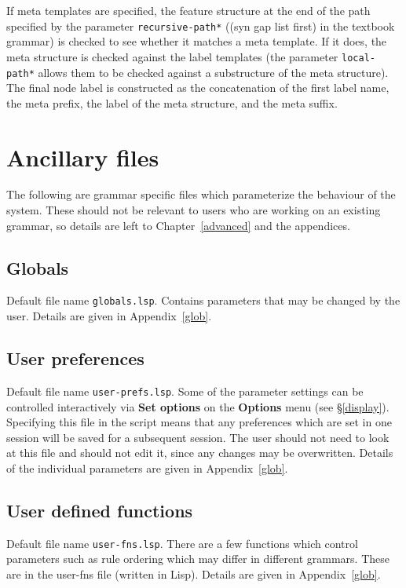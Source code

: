 \documentclass[12pt]{report}
\newcommand{\filename}[1]{{\tt #1}}
\newcommand{\lkbparam}[1]{{\tt #1}}
\newcommand{\lkbmenucommand}{\bf}
\begin{document}
If meta templates are specified, the feature structure at the
end of the path specified by the parameter \lkbparam{*recursive-path*}
(({\feature syn gap list first}) in the textbook grammar)
is checked to see whether it matches a meta template.
If it does, the meta structure is checked against the label templates 
(the parameter \lkbparam{*local-path*}
allows them to be checked against a substructure of the meta structure).
The final node label is constructed as the concatenation
of the first label name, the meta prefix, the label of
the meta structure, and the meta suffix.  


\section{Ancillary files}
\label{ancil}

The following are grammar specific files which parameterize the behaviour of
the system.  These should not be relevant to users who are working on an
existing grammar, so details are left to Chapter~\ref{advanced} and the
appendices.

\subsection{Globals}

Default file name \filename{globals.lsp}.
Contains parameters that may be changed by the user.  
Details are given in Appendix~\ref{glob}.

\subsection{User preferences}

Default file name \filename{user-prefs.lsp}.
Some of the parameter settings can be controlled interactively
via {\lkbmenucommand Set options} on the {\lkbmenucommand Options} menu 
(see \S\ref{display}).
Specifying this file in the script means that any preferences 
which are set in one session will be saved for a subsequent session.
The user should not need to look at this file and 
should not edit it, since any changes may be overwritten.
Details of the individual
parameters are given in Appendix~\ref{glob}.

\subsection{User defined functions}

Default file name \filename{user-fns.lsp}.
There are a few functions which control parameters such as rule
ordering which may differ in different grammars.  These are
in the user-fns file (written in Lisp).
Details are given in Appendix~\ref{glob}.
\end{document}
